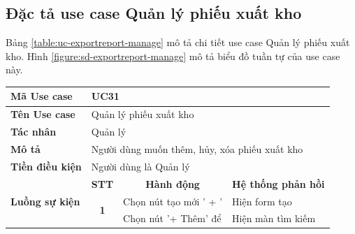 \documentclass[../DoAn.tex]{subfiles}
\begin{document}
\subsection{Đặc tả use case Quản lý phiếu xuất kho}
\label{section:uc-exportreport-manage}
Bảng \ref{table:uc-exportreport-manage} mô tả chi tiết use case Quản lý phiếu xuất kho. Hình \ref{figure:sd-exportreport-manage} mô tả biểu đồ tuần tự của use case này.
\begin{table}[H]
    \begin{tabular}{|l|c|l|l|}
        \hline
        \textbf{Mã Use case}                     & \multicolumn{3}{l|}{UC31}                                                                                                                                        \\ \hline
        \textbf{Tên Use case}                    & \multicolumn{3}{l|}{Quản lý phiếu xuất kho}                                                                                                                      \\ \hline
        \textbf{Tác nhân}                        & \multicolumn{3}{l|}{Quản lý}                                                                                                                                     \\ \hline
        \textbf{Mô tả}                           & \multicolumn{3}{l|}{Người dùng muốn thêm, hủy, xóa phiếu xuất kho}                                                                                               \\ \hline
        \textbf{Tiền điều kiện}                  & \multicolumn{3}{l|}{Người dùng là Quản lý}                                                                                                                       \\ \hline
        \multirow{14}{*}{\textbf{Luồng sự kiện}} & \multicolumn{1}{c|}{\textbf{STT}}                                  & \multicolumn{1}{c|}{\textbf{Hành động}}   & \multicolumn{1}{c|}{\textbf{Hệ thống phản hồi}} \\ \cline{2-4}
                                                 & \multirow{10}{*}{\textbf{1}}                                       & Chọn nút tạo mới ' + '                    & Hiện form tạo                                   \\ \cline{3-4}
                                                 &                                                                    & Chọn nút '+ Thêm' để                      & Hiện màn tìm kiếm                               \\

\end{tabular}
\end{table}
\end{document}
